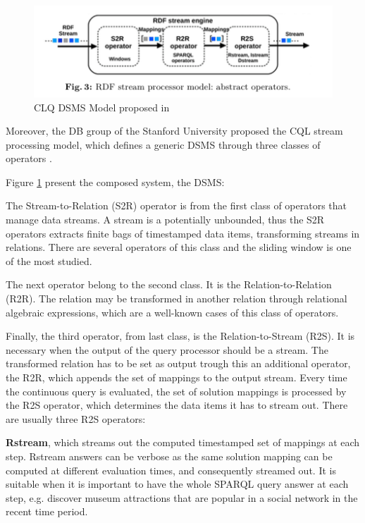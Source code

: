 \begin{figure}[tbh]
  \centering
	\includegraphics[width=\linewidth]{images/cql}
	\caption{CLQ DSMS Model proposed in  \cite{Arasu2006} } 
  	\label{fig:cql}
\end{figure}


Moreover, the DB group of the Stanford University proposed the CQL stream processing model, which defines a generic DSMS through three classes of operators \cite{Arasu2006}.

Figure \ref{fig:cql} present the composed system, the DSMS:  

The Stream-to-Relation (S2R) operator is from the first class of operators that manage data streams.  A stream is a potentially unbounded, thus the S2R operators extracts finite bags of timestamped data items, transforming streams in relations. There are several operators of this class and the sliding window is one of the most studied. 

The next operator belong to the second class. It is the Relation-to-Relation (R2R). The relation may be transformed in another relation through relational algebraic expressions, which are a well-known cases of this class of operators. 

Finally, the third operator, from last class, is the Relation-to-Stream (R2S). It is necessary when the output of the query processor should be a stream. The transformed relation has to be set as output trough this an additional operator, the R2R, which appends the set of mappings to the output stream. Every time the continuous query is evaluated, the set of solution mappings is processed by the R2S operator, which determines the data items it has to stream out. There are usually three R2S operators:

\textbf{Rstream}, which streams out the computed timestamped set of mappings at each step. Rstream answers can be verbose as the same solution mapping can be computed at different evaluation times, and consequently streamed out. It is suitable when it is important to have the whole SPARQL query answer at each step, e.g. discover museum attractions that are popular in a social network in the recent time period.

